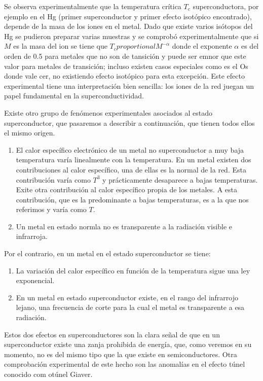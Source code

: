 Se observa experimentalmente que la temperatura crítica $T_c$ superconductora, por ejemplo en el Hg (primer superconductor y primer efecto isotópico encontrado), depende de la masa de los iones en el metal. Dado que existe varios isótopos del Hg se pudieron preparar varias muestras y se comprobó experimentalmente que si $M$ es la masa del ion se tiene que $T_c proportional M^{-\alpha}$ donde el exponente $\alpha$ es del orden de 0.5 para metales que no son de tansición y puede ser emnor que este valor para metales de transición; incluso existen casos especiales como es el Os donde vale cer, no existiendo efecto isotópico para esta excepción. Este efecto experimental tiene una interpretación bien sencilla: los iones de la red juegan un papel fundamental en la superconductividad.

Existe otro grupo de fenómenos experimentales asociados al estado superconductor, que pasaremos a describir a continuación, que tienen todos ellos el mismo origen.

\begin{enumerate}
    \item El calor específico electrónico de un metal no superconductor a muy baja temperatura varía linealmente con la temperatura. En un metal existen dos contribuciones al calor específico, una de ellas es la normal de la red. Esta contribución varía como $T^3$ y prácticamente desaparece a bajas temperaturas. Exite otra contribución al calor específico propia de los metales. A esta contribución, que es la predominante a bajas temperaturas, es a la que nos referimos y varía como $T$.
    \item Un metal en estado normla no es transparente a la radiación visible e infrarroja.
\end{enumerate}

Por el contrario, en un metal en el estado superconductor se tiene:

\begin{enumerate}
    \item La variación del calor específico en función de la temperatura sigue una ley exponencial.
    \item En un metal en estado superconductor existe, en el rango del infrarrojo lejano, una frecuencia de corte para la cual el metal es transparente a esa radiación.
\end{enumerate}

Estos dos efectos en superconductores son la clara señal de que en un superconductor existe una zanja prohibida de energía, que, como veremos en su momento, no es del mismo tipo que la que existe en semiconductores. Otra comprobación experimental de este hecho son las anomalías en el efecto túnel conocido com otúnel Giaver.

